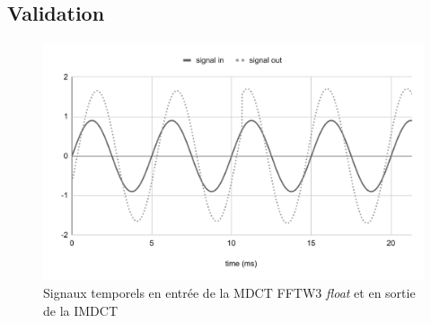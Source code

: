 \documentclass{article}
\begin{document}


    \subsection{Validation}

    \paragraph{}%
    \begin{figure}[H]
        \centering
        \includegraphics[width=.8\linewidth]{./images/fftw3_mdct_f32_signal_in_out.pdf}
        \caption{Signaux temporels en entrée de la MDCT FFTW3 \emph{float} et en sortie de la IMDCT}
        \label{fig:signal_imdct}
    \end{figure}
\end{document}
